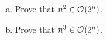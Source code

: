 \exercise
\begin{enumerate}[(a)]
\item Prove that $n^2 \in \mathcal{O}(2^n)$. 
\item Prove that $n^3 \in \mathcal{O}(2^n)$.
      \eoxs
      
\end{enumerate}

